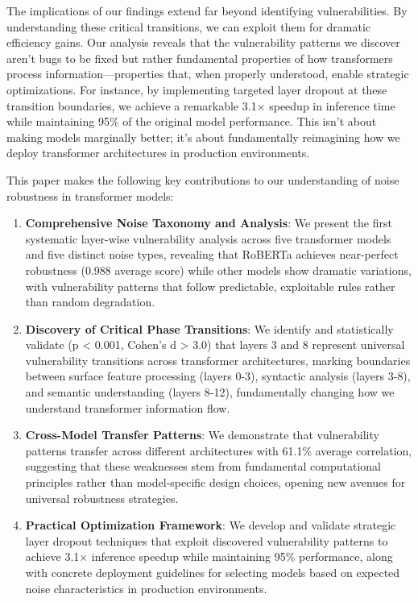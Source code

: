 The implications of our findings extend far beyond identifying vulnerabilities. By understanding these critical transitions, we can exploit them for dramatic efficiency gains. Our analysis reveals that the vulnerability patterns we discover aren't bugs to be fixed but rather fundamental properties of how transformers process information---properties that, when properly understood, enable strategic optimizations. For instance, by implementing targeted layer dropout at these transition boundaries, we achieve a remarkable 3.1× speedup in inference time while maintaining 95\% of the original model performance. This isn't about making models marginally better; it's about fundamentally reimagining how we deploy transformer architectures in production environments.

This paper makes the following key contributions to our understanding of noise robustness in transformer models:

\begin{enumerate}
\item \textbf{Comprehensive Noise Taxonomy and Analysis}: We present the first systematic layer-wise vulnerability analysis across five transformer models and five distinct noise types, revealing that RoBERTa achieves near-perfect robustness (0.988 average score) while other models show dramatic variations, with vulnerability patterns that follow predictable, exploitable rules rather than random degradation.

\item \textbf{Discovery of Critical Phase Transitions}: We identify and statistically validate (p < 0.001, Cohen's d > 3.0) that layers 3 and 8 represent universal vulnerability transitions across transformer architectures, marking boundaries between surface feature processing (layers 0-3), syntactic analysis (layers 3-8), and semantic understanding (layers 8-12), fundamentally changing how we understand transformer information flow.

\item \textbf{Cross-Model Transfer Patterns}: We demonstrate that vulnerability patterns transfer across different architectures with 61.1\% average correlation, suggesting that these weaknesses stem from fundamental computational principles rather than model-specific design choices, opening new avenues for universal robustness strategies.

\item \textbf{Practical Optimization Framework}: We develop and validate strategic layer dropout techniques that exploit discovered vulnerability patterns to achieve 3.1× inference speedup while maintaining 95\% performance, along with concrete deployment guidelines for selecting models based on expected noise characteristics in production environments.
\end{enumerate}

